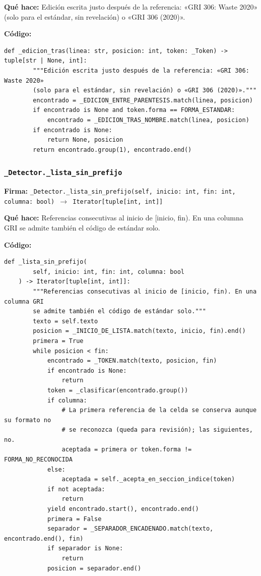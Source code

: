 \documentclass[11pt,a4paper]{article}
\begin{document}
\textbf{Qué hace:} Edición escrita justo después de la referencia: «GRI 306: Waste 2020»
(solo para el estándar, sin revelación) o «GRI 306 (2020)».

\textbf{Código:}
\begin{lstlisting}
def _edicion_tras(linea: str, posicion: int, token: _Token) -> tuple[str | None, int]:
        """Edición escrita justo después de la referencia: «GRI 306: Waste 2020»
        (solo para el estándar, sin revelación) o «GRI 306 (2020)»."""
        encontrado = _EDICION_ENTRE_PARENTESIS.match(linea, posicion)
        if encontrado is None and token.forma == FORMA_ESTANDAR:
            encontrado = _EDICION_TRAS_NOMBRE.match(linea, posicion)
        if encontrado is None:
            return None, posicion
        return encontrado.group(1), encontrado.end()
\end{lstlisting}

\subsubsection*{\texttt{\_Detector.\_lista\_sin\_prefijo}}
\textbf{Firma:} \texttt{\_Detector.\_lista\_sin\_prefijo(self, inicio: int, fin: int, columna: bool) $\rightarrow$ Iterator[tuple[int, int]]}

\textbf{Qué hace:} Referencias consecutivas al inicio de [inicio, fin). En una columna GRI
se admite también el código de estándar solo.

\textbf{Código:}
\begin{lstlisting}
def _lista_sin_prefijo(
        self, inicio: int, fin: int, columna: bool
    ) -> Iterator[tuple[int, int]]:
        """Referencias consecutivas al inicio de [inicio, fin). En una columna GRI
        se admite también el código de estándar solo."""
        texto = self.texto
        posicion = _INICIO_DE_LISTA.match(texto, inicio, fin).end()
        primera = True
        while posicion < fin:
            encontrado = _TOKEN.match(texto, posicion, fin)
            if encontrado is None:
                return
            token = _clasificar(encontrado.group())
            if columna:
                # La primera referencia de la celda se conserva aunque su formato no
                # se reconozca (queda para revisión); las siguientes, no.
                aceptada = primera or token.forma != FORMA_NO_RECONOCIDA
            else:
                aceptada = self._acepta_en_seccion_indice(token)
            if not aceptada:
                return
            yield encontrado.start(), encontrado.end()
            primera = False
            separador = _SEPARADOR_ENCADENADO.match(texto, encontrado.end(), fin)
            if separador is None:
                return
            posicion = separador.end()
\end{lstlisting}
\end{document}
